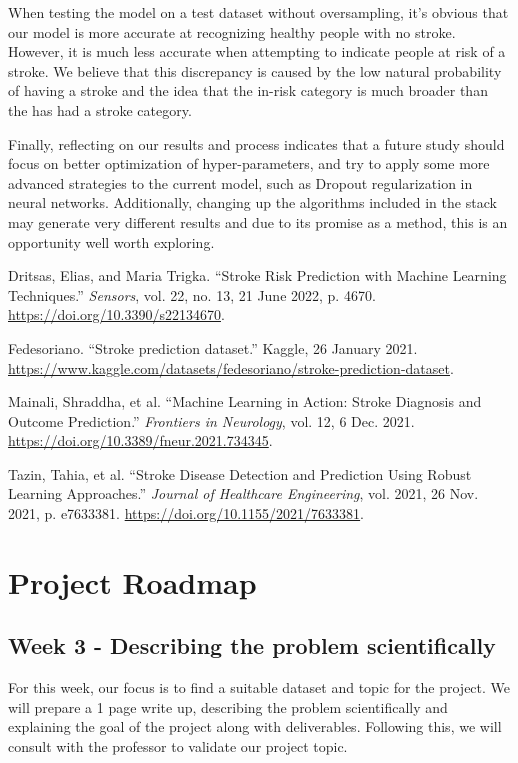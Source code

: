 \documentclass[11pt]{article}
\begin{document}
When testing the model on a test dataset without oversampling, it’s obvious that our model is more accurate at recognizing healthy people with no stroke. However, it is much less accurate when attempting to indicate people at risk of a stroke.  We believe that this discrepancy is caused by the low natural probability of having a stroke and the idea that the in-risk category is much broader than the has had a stroke category.

\medskip

Finally, reflecting on our results and process indicates that a future study should focus on better optimization of hyper-parameters, and try to apply some more advanced strategies to the current model, such as Dropout regularization in neural networks. Additionally, changing up the algorithms included in the stack may generate very different results and due to its promise as a method, this is an opportunity well worth exploring.

\newpage
\begin{thebibliography}{99}
Dritsas, Elias, and Maria Trigka. ``Stroke Risk Prediction with Machine Learning Techniques.'' \emph{Sensors}, vol. 22, no. 13, 21 June 2022, p. 4670. \url{https://doi.org/10.3390/s22134670}.

Fedesoriano. ``Stroke prediction dataset.'' Kaggle, 26 January 2021. \url{https://www.kaggle.com/datasets/fedesoriano/stroke-prediction-dataset}.

Mainali, Shraddha, et al. ``Machine Learning in Action: Stroke Diagnosis and Outcome Prediction.'' \emph{Frontiers in Neurology}, vol. 12, 6 Dec. 2021. \url{https://doi.org/10.3389/fneur.2021.734345}.

Tazin, Tahia, et al. ``Stroke Disease Detection and Prediction Using Robust Learning Approaches.'' \emph{Journal of Healthcare Engineering}, vol. 2021, 26 Nov. 2021, p. e7633381. \url{https://doi.org/10.1155/2021/7633381}.
\end{thebibliography}

\newpage
\section*{Project Roadmap}

\subsection*{Week 3 - Describing the problem scientifically}
For this week, our focus is to find a suitable dataset and topic for the project. We will prepare a 1 page write up, describing the problem scientifically and explaining the goal of the project along with deliverables. Following this, we will consult with the professor to validate our project topic.
\end{document}
